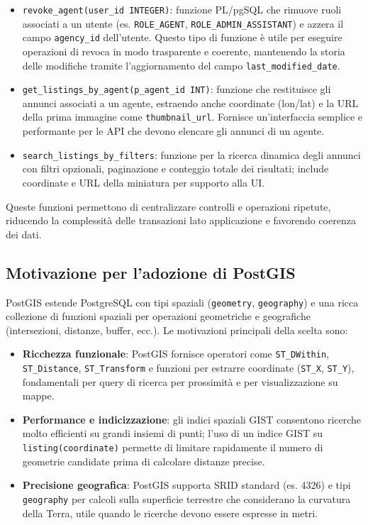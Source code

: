 \begin{itemize}
	\item \texttt{revoke\_agent(user\_id INTEGER)}: funzione PL/pgSQL che rimuove ruoli associati a un utente (es. \texttt{ROLE\_AGENT}, \texttt{ROLE\_ADMIN\_ASSISTANT}) e azzera il campo \texttt{agency\_id} dell'utente. Questo tipo di funzione è utile per eseguire operazioni di revoca in modo trasparente e coerente, mantenendo la storia delle modifiche tramite l'aggiornamento del campo \texttt{last\_modified\_date}.

    \item  \texttt{get\_listings\_by\_agent(p\_agent\_id INT)}: funzione che restituisce gli annunci associati a un agente, estraendo anche coordinate (lon/lat) e la URL della prima immagine come \texttt{thumbnail\_url}. Fornisce un'interfaccia semplice e performante per le API che devono elencare gli annunci di un agente.

    \item \texttt{search\_listings\_by\_filters}: funzione per la ricerca dinamica degli annunci con filtri opzionali, paginazione e conteggio totale dei risultati; include coordinate e URL della miniatura per supporto alla UI.
\end{itemize}

Queste funzioni permettono di centralizzare controlli e operazioni ripetute, riducendo la complessità delle transazioni lato applicazione e favorendo coerenza dei dati.

\subsection{Motivazione per l'adozione di PostGIS}
PostGIS estende PostgreSQL con tipi spaziali (\texttt{geometry}, \texttt{geography}) e una ricca collezione di funzioni spaziali per operazioni geometriche e geografiche (intersezioni, distanze, buffer, ecc.). Le motivazioni principali della scelta sono:

\begin{itemize}
	\item \textbf{Ricchezza funzionale}: PostGIS fornisce operatori come \texttt{ST\_DWithin}, \texttt{ST\_Distance}, \texttt{ST\_Transform} e funzioni per estrarre coordinate (\texttt{ST\_X}, \texttt{ST\_Y}), fondamentali per query di ricerca per prossimità e per visualizzazione su mappe.

	\item  \textbf{Performance e indicizzazione}: gli indici spaziali GIST consentono ricerche molto efficienti su grandi insiemi di punti; l'uso di un indice GIST su \texttt{listing(coordinate)} permette di limitare rapidamente il numero di geometrie candidate prima di calcolare distanze precise.
	
	\item  \textbf{Precisione geografica}: PostGIS supporta SRID standard (es. 4326) e tipi \texttt{geography} per calcoli sulla superficie terrestre che considerano la curvatura della Terra, utile quando le ricerche devono essere espresse in metri.
\end{itemize}

